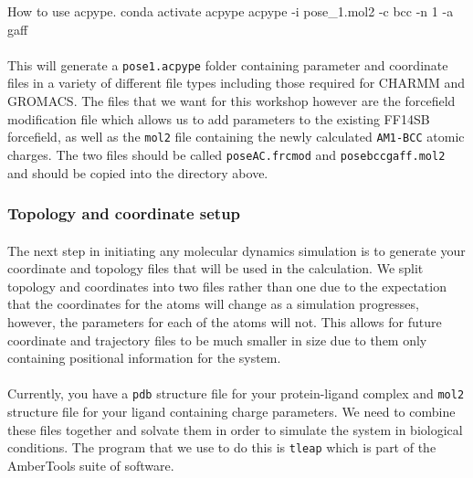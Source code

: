     \begin{bashcmd}[label=listing:acpypeCMD]{How to use acpype.}
        conda activate acpype
        acpype -i pose_1.mol2 -c bcc -n 1 -a gaff
    \end{bashcmd}

    \paragraph{}
        This will generate a \texttt{pose\textunderscore 1.acpype} folder containing parameter and coordinate files in a variety of different file types including those required for CHARMM\cite{Brooks1983CHARMM:Calculations} and GROMACS\cite{Berendsen1995GROMACS:Implementation}. The files that we want for this workshop however are the forcefield modification file which allows us to add parameters to the existing FF14SB\cite{Maier2015Ff14SB:Ff99SB} forcefield, as well as the \texttt{mol2} file containing the newly calculated \texttt{AM1-BCC} atomic charges. The two files should be called \texttt{pose\textunderscore AC.frcmod} and \texttt{pose\textunderscore bcc\textunderscore gaff.mol2} and should be copied into the directory above.

\subsubsection{Topology and coordinate setup}
    \paragraph{}
        The next step in initiating any molecular dynamics simulation is to generate your coordinate and topology files that will be used in the calculation. We split topology and coordinates into two files rather than one due to the expectation that the coordinates for the atoms will change as a simulation progresses, however, the parameters for each of the atoms will not. This allows for future coordinate and trajectory files to be much smaller in size due to them only containing positional information for the system.

    \paragraph{}
        Currently, you have a \texttt{pdb} structure file for your protein-ligand complex and \texttt{mol2} structure file for your ligand containing charge parameters. We need to combine these files together and solvate them in order to simulate the system in biological conditions. The program that we use to do this is \texttt{tleap} which is part of the AmberTools suite of software.

